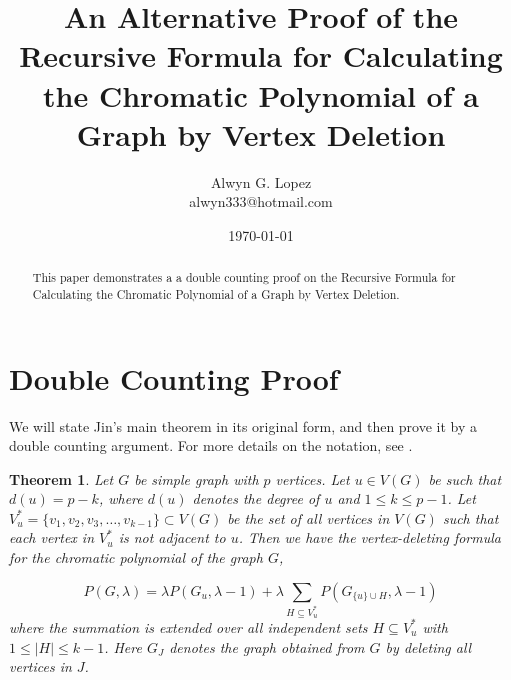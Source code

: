 \documentclass[11pt]{article}
\newtheorem*{thm*}{Theorem}
\begin{document}

\title{An Alternative Proof of the Recursive Formula for Calculating the Chromatic Polynomial of a Graph by Vertex Deletion}

\author{Alwyn G. Lopez \\
alwyn333@hotmail.com}

\date{\today}
\maketitle

\begin{abstract}
This paper demonstrates a a double counting proof on the Recursive Formula for Calculating the Chromatic Polynomial of a Graph by Vertex Deletion.
\end{abstract}

\section{Double Counting Proof}
\label{sec:intro}

We will state Jin's main theorem in its original form, and then prove it by a double counting argument. For more details on the notation, see \cite{Jin04}.

\begin{thm*}
Let $G$ be simple graph with $p$ vertices. Let $u \in V(G)$ be such that $d(u) = p - k$, where $d(u)$ denotes the degree of $u$ and $1 \leq k \leq p - 1$. Let $V_{u}^* = \{v_1, v_2, v_3,\ldots,v_{k - 1}\} \subset V(G)$ be the set of all vertices in $V(G)$ such that each vertex in $V_{u}^*$ is not adjacent to $u$. Then we have the vertex-deleting formula for the chromatic polynomial of the graph $G$,

\begin{equation}
P(G,\lambda) = \lambda P(G_u, \lambda - 1) + \lambda\sum_{H \subseteq V_{u}^*} P(G_{\{u\} \cup H}, \lambda - 1)
\end{equation}where the summation is extended over all independent sets $H \subseteq V_{u}^*$ with $ 1 \leq |H| \leq k - 1$. Here $G_J$ denotes the graph obtained from $G$ by deleting all vertices in $J$.
\end{thm*}
\end{document}
